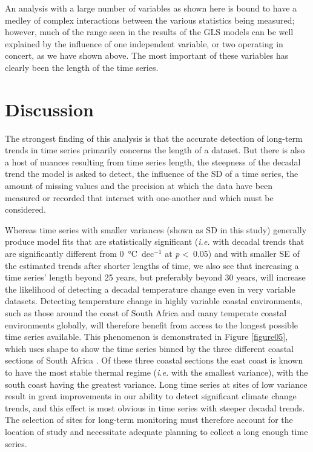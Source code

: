 \documentclass[]{ametsoc}
\begin{document}
An analysis with a large number of variables as shown here is bound to have a medley of complex interactions between the various statistics being measured; however, much of the range seen in the results of the GLS models can be well explained by the influence of one independent variable, or two operating in concert, as we have shown above. The most important of these variables has clearly been the length of the time series.

\section{Discussion}
The strongest finding of this analysis is that the accurate detection of long-term trends in time series primarily concerns the length of a dataset. But there is also a host of nuances resulting from time series length, the steepness of the decadal trend the model is asked to detect, the influence of the SD of a time series, the amount of missing values and the precision at which the data have been measured or recorded that interact with one-another and which must be considered.

Whereas time series with smaller variances (shown as SD in this study) generally produce model fits that are statistically significant (\emph{i.e.} with decadal trends that are significantly different from \SI{0}{\degreeCelsius}~dec$^{-1}$ at \emph{p} \textless~0.05) and with smaller SE of the estimated trends after shorter lengths of time, we also see that increasing a time series' length beyond 25 years, but preferably beyond 30 years, will increase the likelihood of detecting a decadal temperature change even in very variable datasets. Detecting temperature change in highly variable coastal environments, such as those around the coast of South Africa and many temperate coastal environments globally, will therefore benefit from access to the longest possible time series available. This phenomenon is demonstrated in Figure \ref{figure05}, which uses shape to show the time series binned by the three different coastal sections of South Africa \citep{Smit2013}. Of these three coastal sections the east coast is known to have the most stable thermal regime (\emph{i.e.} with the smallest variance), with the south coast having the greatest variance. Long time series at sites of low variance result in great improvements in our ability to detect significant climate change trends, and this effect is most obvious in time series with steeper decadal trends. The selection of sites for long-term monitoring must therefore account for the location of study and necessitate adequate planning to collect a long enough time series.
\end{document}

